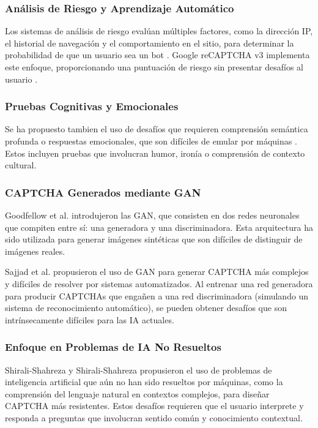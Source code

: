 \documentclass[conference]{IEEEtran}
\begin{document}
\subsubsection{Análisis de Riesgo y Aprendizaje Automático}

Los sistemas de análisis de riesgo evalúan múltiples factores, como la dirección IP, el historial de navegación y el comportamiento en el sitio, para determinar la probabilidad de que un usuario sea un bot \cite{Kumar2019}. Google reCAPTCHA v3 implementa este enfoque, proporcionando una puntuación de riesgo sin presentar desafíos al usuario \cite{GoogleReCAPTCHA}.

\subsubsection{Pruebas Cognitivas y Emocionales}

Se ha propuesto tambien el uso de desafíos que requieren comprensión semántica profunda o respuestas emocionales, que son difíciles de emular por máquinas \cite{Vazquez2018}. Estos incluyen pruebas que involucran humor, ironía o comprensión de contexto cultural.

\subsubsection{CAPTCHA Generados mediante GAN}

Goodfellow et al. \cite{Goodfellow2014_GAN} introdujeron las GAN, que consisten en dos redes neuronales que compiten entre sí: una generadora y una discriminadora. Esta arquitectura ha sido utilizada para generar imágenes sintéticas que son difíciles de distinguir de imágenes reales.

Sajjad et al. \cite{Sajjad2019} propusieron el uso de GAN para generar CAPTCHA más complejos y difíciles de resolver por sistemas automatizados. Al entrenar una red generadora para producir CAPTCHAs que engañen a una red discriminadora (simulando un sistema de reconocimiento automático), se pueden obtener desafíos que son intrínsecamente difíciles para las IA actuales.

\subsubsection{Enfoque en Problemas de IA No Resueltos}

Shirali-Shahreza y Shirali-Shahreza \cite{Shirali2018} propusieron el uso de problemas de inteligencia artificial que aún no han sido resueltos por máquinas, como la comprensión del lenguaje natural en contextos complejos, para diseñar CAPTCHA más resistentes. Estos desafíos requieren que el usuario interprete y responda a preguntas que involucran sentido común y conocimiento contextual.
\end{document}
